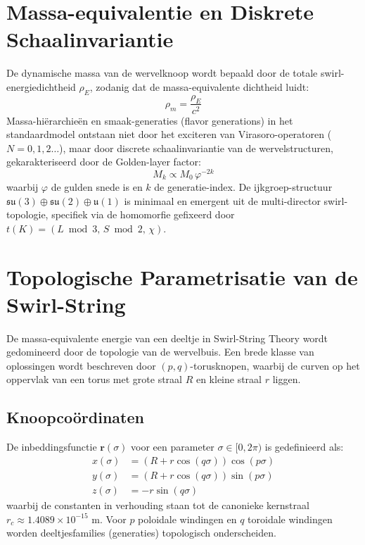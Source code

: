 \documentclass[12pt,a4paper]{article}
\begin{document}
    \section{Massa-equivalentie en Diskrete Schaalinvariantie}
        
        De dynamische massa van de wervelknoop wordt bepaald door de totale swirl-energiedichtheid $\rho_{\!E}$, zodanig dat de massa-equivalente dichtheid luidt:
        \begin{equation}
            \rho_{\!m} = \frac{\rho_{\!E}}{c^2}
        \end{equation}
        Massa-hi\"erarchie\"en en smaak-generaties (flavor generations) in het standaardmodel ontstaan niet door het exciteren van Virasoro-operatoren ($N=0,1,2\dots$), maar door discrete schaalinvariantie van de wervelstructuren, gekarakteriseerd door de Golden-layer factor:
        \begin{equation}
            M_k \propto M_0\,\varphi^{-2k}
        \end{equation}
        waarbij $\varphi$ de gulden snede is en $k$ de generatie-index. De ijkgroep-structuur $\mathfrak{su}(3)\oplus\mathfrak{su}(2)\oplus\mathfrak{u}(1)$ is minimaal en emergent uit de multi-director swirl-topologie, specifiek via de homomorfie gefixeerd door $t(K) = (L \bmod 3,\, S \bmod 2,\, \chi)$.
        


        

            \section*{Topologische Parametrisatie van de Swirl-String}
                
                De massa-equivalente energie van een deeltje in Swirl-String Theory wordt gedomineerd door de topologie van de wervelbuis. Een brede klasse van oplossingen wordt beschreven door $(p,q)$-torusknopen, waarbij de curven op het oppervlak van een torus met grote straal $R$ en kleine straal $r$ liggen.
                
                \subsection*{Knoopco\"ordinaten}
                    De inbeddingsfunctie $\mathbf{r}(\sigma)$ voor een parameter $\sigma \in [0, 2\pi)$ is gedefinieerd als:
                    \begin{align}
                        x(\sigma) &= \left( R + r \cos(q\sigma) \right) \cos(p\sigma) \\
                        y(\sigma) &= \left( R + r \cos(q\sigma) \right) \sin(p\sigma) \\
                        z(\sigma) &= -r \sin(q\sigma)
                    \end{align}
                    waarbij de constanten in verhouding staan tot de canonieke kernstraal $r_c \approx 1.4089 \times 10^{-15} \text{ m}$. Voor $p$ poloidale windingen en $q$ toroidale windingen worden deeltjesfamilies (generaties) topologisch onderscheiden.
                
\end{document}
